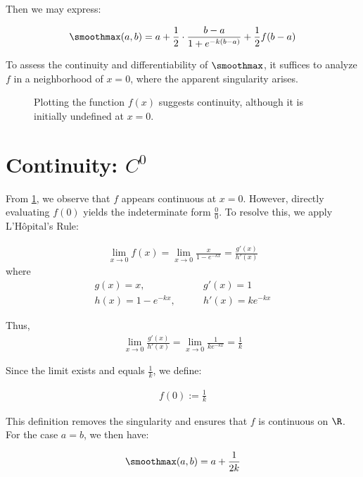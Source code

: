 Then we may express:

\begin{align}
    \smoothmax(a, b) = a + \frac{1}{2} \cdot \frac{b - a}{1 + e^{-k(b - a)}} + \frac{1}{2} f(b - a)
\end{align}

To assess the continuity and differentiability of $\smoothmax$, it suffices to analyze $f$ in a neighborhood of $x = 0$, where the apparent singularity arises.

\begin{figure}
    \caption{Plotting the function $f(x)$ suggests continuity, although it is initially undefined at $x = 0$.}
    \label{fig:smoothmax-f-plot}
\end{figure}

\section{Continuity: $C^0$}

From \cref{fig:smoothmax-f-plot}, we observe that $f$ appears continuous at $x = 0$. However, directly evaluating $f(0)$ yields the indeterminate form $\frac{0}{0}$. To resolve this, we apply L’Hôpital’s Rule:

\begin{align}
    \lim_{x \to 0} f(x) = \lim_{x \to 0} \frac{x}{1 - e^{-kx}} = \frac{g'(x)}{h'(x)}
\end{align}
where
\begin{align}
    g(x) = x, \quad & \quad g'(x) = 1 \\
    h(x) = 1 - e^{-kx}, \quad & \quad h'(x) = k e^{-kx}
\end{align}

Thus,
\begin{align}
    \lim_{x \to 0} \frac{g'(x)}{h'(x)} = \lim_{x \to 0} \frac{1}{k e^{-kx}} = \frac{1}{k}
\end{align}

Since the limit exists and equals $\frac{1}{k}$, we define:

\begin{align}
    f(0) := \frac{1}{k}
\end{align}

This definition removes the singularity and ensures that $f$ is continuous on $\R$. For the case $a = b$, we then have:

\begin{align}
    \smoothmax(a, b) = a + \frac{1}{2k}
\end{align}

